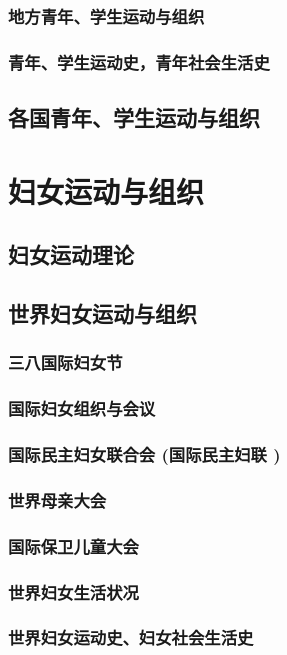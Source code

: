 \documentclass[UTF8]{../RepresentationUniverse}
\begin{document}
    \subsubsection{地方青年、学生运动与组织}
    \subsubsection{青年、学生运动史，青年社会生活史}
   
\subsection{各国青年、学生运动与组织}



\section{妇女运动与组织}
\subsection{妇女运动理论}
\subsection{世界妇女运动与组织}
    \subsubsection{三八国际妇女节}
    \subsubsection{国际妇女组织与会议}
    \subsubsection{国际民主妇女联合会 (国际民主妇联 )}
    \subsubsection{世界母亲大会}
    \subsubsection{国际保卫儿童大会}
    \subsubsection{世界妇女生活状况}
    \subsubsection{世界妇女运动史、妇女社会生活史}
\end{document}
